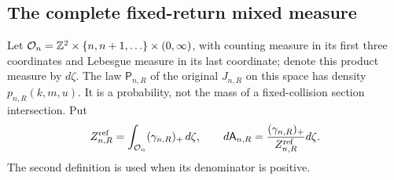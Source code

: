 \subsection{The complete fixed-return mixed measure}
Let $\mathcal O_n=\mathbb Z^2\times\{n,n+1,\ldots\}\times(0,\infty)$,
with counting measure in its first three coordinates and Lebesgue
measure in its last coordinate; denote this product measure by $d\zeta$.
The law $\mathsf P_{n,R}$ of the original $J_{n,R}$ on this space has
density $p_{n,R}(k,m,u)$. It is a probability, not the mass of a
fixed-collision section intersection. Put
\begin{equation}\label{eq:v57-full-reference}
 Z_{n,R}^{\rm ref}=\int_{\mathcal O_n}(\gamma_{n,R})_+\,d\zeta,
 \qquad
 d\mathsf A_{n,R}=\frac{(\gamma_{n,R})_+}{Z_{n,R}^{\rm ref}}d\zeta.
\end{equation}
The second definition is used when its denominator is positive.

